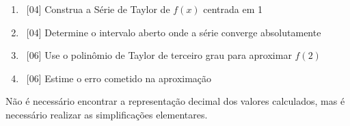 \documentclass[a4paper,12pt,fleqn]{article}
\begin{document}
\begin{enumerate}[label=\alph*)]
  \item\ [04] Construa a Série de Taylor de $f(x)$ centrada em 1
  \item\ [04] Determine o intervalo aberto onde a série converge absolutamente
  \item\ [06] Use o polinômio de Taylor de terceiro grau para aproximar \(f(2)\)
  \item\ [06] Estime o erro cometido na aproximação
\end{enumerate}
Não é necessário encontrar a representação decimal dos valores calculados,
mas é necessário realizar as simplificações elementares.

\begin{answer}
\end{answer}

\end{document}
